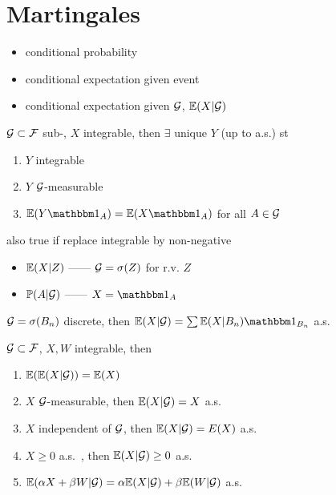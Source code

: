 \section{Martingales}\label{sec:martingales}

\begin{itemize}
    \item conditional probability
    \item conditional expectation given event
    \item conditional expectation given $\mathcal{G}$,  $\mathbb{E}(X|\mathcal{G})$
\end{itemize}

\begin{thm}
    $\mathcal{G} \subset \mathcal{F}$ sub-\sa, $X$ integrable, then $\exists$ unique $Y$ (up to a.s.) st
    \begin{enumerate}
        \item $Y$ integrable
        \item $Y$ $\mathcal{G}$-measurable
        \item $\Ex(Y\In_A) = \Ex(X\In_A)$ for all $A \in \mathcal{G}$
    \end{enumerate}
\end{thm}

\begin{fact}
    also true if replace integrable by non-negative
\end{fact}

\begin{itemize}
    \item $\mathbb{E}(X|Z)$ ------ $\mathcal{G} = \sigma(Z)$ for r.v. $Z$
    \item $\mathbb{P}(A|\mathcal{G})$ ------ $X = \In_A$
\end{itemize}

\begin{fact}
    $\mathcal{G} = \sigma(B_n)$ discrete, then $\Ex(X|\G) = \sum\Ex(X|B_n)\In_{B_n}$ a.s.\
\end{fact}

\begin{prop}
    $\mathcal{G} \subset \mathcal{F}$, $X, W$ integrable, then
    \begin{enumerate}
        \item $\mathbb{E}(\mathbb{E}(X|\mathcal{G})) = \mathbb{E}(X)$
        \item $X$ $\mathcal{G}$-measurable, then $\mathbb{E}(X|\mathcal{G}) = X$ a.s.
        \item $X$ independent of $\mathcal{G}$, then $\mathbb{E}(X|\mathcal{G}) = E(X)$ a.s.
        \item $X \geq 0$ a.s.\ , then $\mathbb{E}(X|\mathcal{G}) \geq 0$ a.s.
        \item $\mathbb{E}(\alpha X + \beta W|\mathcal{G}) = \alpha \mathbb{E}(X|\mathcal{G}) + \beta \mathbb{E}(W|\mathcal{G})$ a.s.
    \end{enumerate}
\end{prop}


